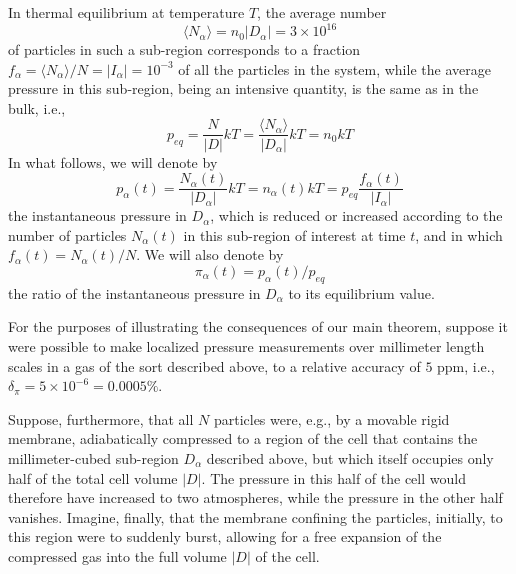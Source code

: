 \documentclass{article}
\numberwithin{equation}{section}
\begin{document}
In thermal equilibrium at temperature $T$, the average number
\begin{equation*}
\langle N_{\alpha }\rangle =n_{0}\left\vert D _{\alpha }\right\vert
=3\times 10^{16}
\end{equation*}
of particles in such a sub-region corresponds to a fraction $f_{\alpha }=\langle
N_{\alpha }\rangle /N=|I_{\alpha }|=10^{-3}$ of all the particles in the
system, while the average pressure in this sub-region, being an intensive quantity,
is the same as in the bulk, i.e.,
\begin{equation*}
p_{eq}=\frac{N}{|D|}kT=\frac{\langle N_{\alpha }\rangle } {|D_{\alpha }| }kT=n_{0}kT
\end{equation*}%
In what follows, we will denote by
\begin{equation*}
p_{\alpha }\left( t\right) =\frac{N_{\alpha }(t)}{\left\vert D _{\alpha
}\right\vert }kT=n_{\alpha }\left( t\right) kT=p_{eq}\frac{f_{\alpha }\left(
t\right) }{|I_{\alpha}|}
\end{equation*}%
the instantaneous pressure in $D _{\alpha }$, which is
reduced or increased according to the number of particles $N_{\alpha }(t)$
in this sub-region of interest at time $t$, and in which
$f_{\alpha }\left(t\right) = N_{\alpha }(t)/N$. We will also denote by
\begin{equation*}
\pi _{\alpha }\left( t\right) =p_{\alpha }\left(
t\right) /p_{eq}
\end{equation*}
the ratio of the instantaneous pressure in $D_{\alpha}$ to
its equilibrium value.

For the purposes of illustrating the consequences of our main theorem, suppose it
were possible to make localized
pressure measurements over millimeter length scales in a gas of the sort
described above, to a relative accuracy of $5$ ppm, i.e., $\delta_{\pi}
=5\times 10^{-6}=0.0005\%$.

Suppose, furthermore, that all $N$ particles were, e.g., by a movable rigid membrane, adiabatically compressed
to a region of the cell that contains the millimeter-cubed sub-region $D_{\alpha}$ described above, but which
itself occupies only half of the total cell volume $|D|$. The pressure in this half of the cell would therefore have increased to two atmospheres, while the pressure in the other half vanishes.
Imagine, finally, that the membrane confining the particles, initially, to this region were to suddenly burst, allowing for a free expansion of the compressed gas into the full volume $|D |$ of the cell.
\end{document}
